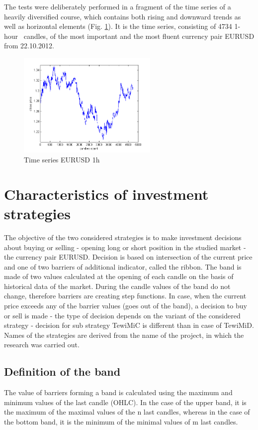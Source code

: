 \documentclass{tewiart}
\begin{document}
The tests were deliberately performed in a fragment of the time series of a heavily diversified course, which contains both rising and downward trends as well as horizontal elements (Fig. \ref{timeSeries}). It is the time series, consisting of 4734  \mbox{1-hour } candles, of the most important and the most fluent currency pair EURUSD from 22.10.2012.
\begin{figure}[h!]
\begin{center}
\includegraphics[width = 0.6\textwidth]{pictures/eurusd221012.png}
\end{center}
\caption{Time series EURUSD 1h}
\label{timeSeries}
\end{figure}
\FloatBarrier
\section{Characteristics of investment strategies}
The objective of the two considered strategies is to make investment decisions about buying or selling - opening long or short position in the studied market - the currency pair EURUSD. Decision is based on intersection of the current price and one of two barriers of additional indicator, called the ribbon. The band is made of two values calculated at the opening of each candle on the basis of historical data of the market. During the candle values of the band do not change, therefore barriers are creating step functions. In case, when the current price exceeds any of the barrier values (goes out of the band), a decision to buy or sell is made - the type of decision depends on the variant of the considered strategy - decision for sub strategy TewiMiC is different than in case of TewiMiD. Names of the strategies are derived from the name of the project, in which the research was carried out.

\subsection{Definition of the band}
The value of barriers forming a band is calculated using the maximum and minimum values of the last candle (OHLC). In the case of the upper band, it is the maximum of the maximal values of the n last candles, whereas in the case of the bottom band, it is the minimum of the minimal values of m last candles. 
\end{document}
